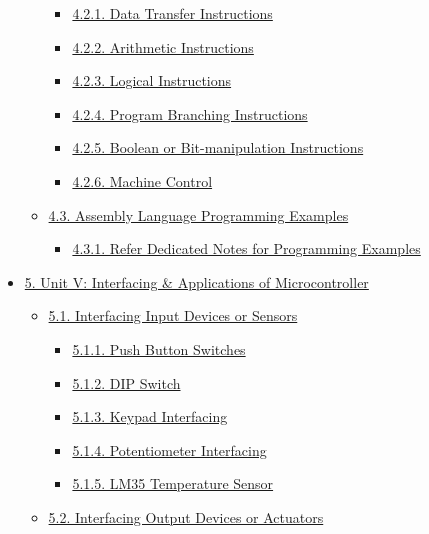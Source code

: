 \documentclass[
]{article}
\begin{document}
\begin{itemize}
\begin{itemize}
    \begin{itemize}
    \item
      \protect\hyperlink{421-data-transfer-instructions}{4.2.1. Data
      Transfer Instructions}
    \item
      \protect\hyperlink{422-arithmetic-instructions}{4.2.2. Arithmetic
      Instructions}
    \item
      \protect\hyperlink{423-logical-instructions}{4.2.3. Logical
      Instructions}
    \item
      \protect\hyperlink{424-program-branching-instructions}{4.2.4.
      Program Branching Instructions}
    \item
      \protect\hyperlink{425-boolean-or-bit-manipulation-instructions}{4.2.5.
      Boolean or Bit-manipulation Instructions}
    \item
      \protect\hyperlink{426-machine-control}{4.2.6. Machine Control}
    \end{itemize}
  \item
    \protect\hyperlink{43-assembly-language-programming-examples}{4.3.
    Assembly Language Programming Examples}

    \begin{itemize}
    \item
      \protect\hyperlink{431-refer-dedicated-notes-for-programming-examples}{4.3.1.
      Refer Dedicated Notes for Programming Examples}
    \end{itemize}
  \end{itemize}
\item
  \protect\hyperlink{5-unit-v-interfacing--applications-of-microcontroller}{5.
  Unit V: Interfacing \& Applications of Microcontroller}

  \begin{itemize}
  \item
    \protect\hyperlink{51-interfacing-input-devices-or-sensors}{5.1.
    Interfacing Input Devices or Sensors}

    \begin{itemize}
    \item
      \protect\hyperlink{511-push-button-switches}{5.1.1. Push Button
      Switches}
    \item
      \protect\hyperlink{512-dip-switch}{5.1.2. DIP Switch}
    \item
      \protect\hyperlink{513-keypad-interfacing}{5.1.3. Keypad
      Interfacing}
    \item
      \protect\hyperlink{514-potentiometer-interfacing}{5.1.4.
      Potentiometer Interfacing}
    \item
      \protect\hyperlink{515-lm35-temperature-sensor}{5.1.5. LM35
      Temperature Sensor}
    \end{itemize}
  \item
    \protect\hyperlink{52-interfacing-output-devices-or-actuators}{5.2.
    Interfacing Output Devices or Actuators}


\end{itemize}
\end{itemize}
\end{document}
